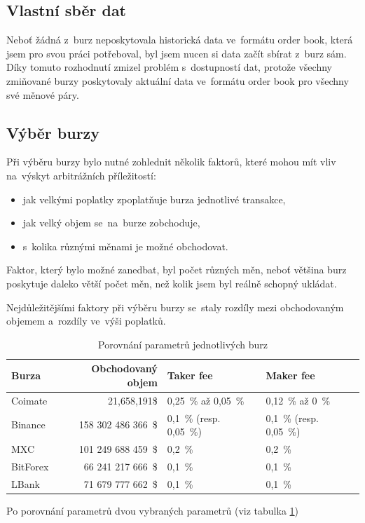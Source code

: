 \documentclass[thesis=B,czech]{FITthesis}[2019/03/21]
\begin{document}
\subsection{Vlastní sběr dat}
Neboť žádná z~burz neposkytovala historická data ve~formátu order book, která jsem pro svou práci potřeboval, byl jsem nucen si data začít sbírat z~burz sám. Díky tomuto rozhodnutí zmizel problém s~dostupností dat, protože všechny zmiňované burzy poskytovaly aktuální data ve~formátu order book pro všechny své měnové páry.

\subsection{Výběr burzy}
Při výběru burzy bylo nutné zohlednit několik faktorů, které mohou mít vliv na~výskyt arbitrážních příležitostí: 
\begin{itemize}
    \item jak velkými poplatky zpoplatňuje burza jednotlivé transakce,
    \item jak velký objem se~na~burze zobchoduje,
    \item s~kolika různými měnami je možné obchodovat.
\end{itemize}
Faktor, který bylo možné zanedbat, byl počet různých měn, neboť většina burz poskytuje daleko větší počet měn, než kolik jsem byl reálně schopný ukládat. 

Nejdůležitějšími faktory při výběru burzy se~staly rozdíly mezi obchodovaným objemem a~rozdíly ve~výši poplatků.

\begin{table}\centering
     \caption{Porovnání parametrů jednotlivých burz}
     \label{exchanges_comparison}
     \begin{tabular}{||l | r | l | l||} 
     \hline
     Burza & Obchodovaný objem & Taker fee & Maker fee \\ [0.5ex]
     \hline\hline
     Coimate & 21,658,191\$ & 0,25~\% až 0,05~\% & 0,12~\% až 0~\%  \\ 
     \hline
     Binance & 158 302 486 366~\$ & 0,1~\% (resp. 0,05~\%) & 0,1~\% (resp. 0,05~\%)  \\ 
     \hline
     MXC & 101 249 688 459~\$ & 0,2~\% & 0,2~\%  \\ 
     \hline
     BitForex & 66 241 217 666~\$ & 0,1~\% & 0,1~\%  \\ 
     \hline
     LBank & 71 679 777 662~\$ & 0,1~\% & 0,1~\%  \\ 
     \hline
    \end{tabular}
\end{table}
Po porovnání parametrů dvou vybraných parametrů (viz tabulka \ref{exchanges_comparison})
\end{document}
